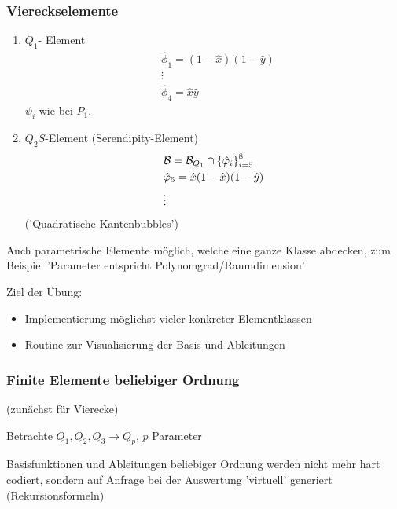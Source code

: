 \subsubsection{Viereckselemente}
\begin{enumerate}
\item $Q_1$- Element
  \begin{align*}
    &\hat \phi_1 = (1- \hat x)(1- \hat y)\\
    &\vdots\\
    &\hat \phi_4 = \hat x \hat y
  \end{align*}
$\psi_i$ wie bei $P_1$. 
\item $Q_2S$-Element (Serendipity-Element)
  \begin{align*}
   & {\cal B} = {\cal B}_{Q_1} \cap \left\{ \hat {\varphi}_i \right\}_{i = 5}^8\\
   & \hat {\varphi} _5 = \hat x (1 - \hat x)(1- \hat y) \\
   & \vdots\\
  \end{align*}
('Quadratische Kantenbubbles')
\end{enumerate}
\begin{bemerkung*}
  Auch parametrische Elemente möglich, welche eine ganze Klasse abdecken, zum Beispiel 'Parameter entspricht Polynomgrad/Raumdimension'
\end{bemerkung*}
Ziel der Übung: 
\begin{itemize}
\item Implementierung möglichst vieler konkreter Elementklassen
\item Routine zur Visualisierung der Basis und Ableitungen 
\end{itemize}
\subsubsection{Finite Elemente beliebiger Ordnung} (zunächst für Vierecke)

Betrachte $Q_1, Q_2, Q_3 \to Q_p$, $p$ Parameter

Basisfunktionen und Ableitungen beliebiger Ordnung werden nicht mehr hart codiert, sondern auf Anfrage bei der Auswertung 'virtuell' generiert (Rekursionsformeln)

